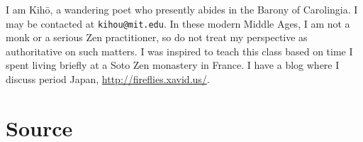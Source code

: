 \documentclass{article}
\begin{document}
\begin{multicols}{2}
I am Kih\=o, a wandering poet who presently abides in the Barony of
Carolingia. I may be contacted at \texttt{kihou@mit.edu}. In these
modern Middle Ages, I am not a monk or a serious Zen practitioner, so
do not treat my perspective as authoritative on such matters. I was
inspired to teach this class based on time I spent living briefly at a
Soto Zen monastery in France. I have a blog where I discuss period
Japan, \url{http://fireflies.xavid.us/}.

\section{Source}

\begin{description}
\cited
\end{description}

\end{multicols}
\end{document}
